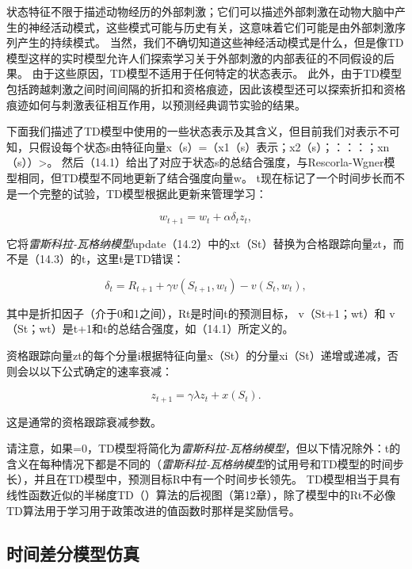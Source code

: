 {状态特征不限于描述动物经历的外部刺激；它们可以描述外部刺激在动物大脑中产生的神经活动模式，这些模式可能与历史有关，这意味着它们可能是由外部刺激序列产生的持续模式。
当然，我们不确切知道这些神经活动模式是什么，但是像TD模型这样的实时模型允许人们探索学习关于外部刺激的内部表征的不同假设的后果。
由于这些原因，TD模型不适用于任何特定的状态表示。
此外，由于TD模型包括跨越刺激之间时间间隔的折扣和资格痕迹，因此该模型还可以探索折扣和资格痕迹如何与刺激表征相互作用，以预测经典调节实验的结果。


下面我们描述了TD模型中使用的一些状态表示及其含义，但目前我们对表示不可知，只假设每个状态s由特征向量x（s）=（x1（s）表示；x2（s）；：：：；xn（s））>。
然后（14.1）给出了对应于状态s的总结合强度，与Rescorla-Wgner模型相同，但TD模型不同地更新了结合强度向量w。
t现在标记了一个时间步长而不是一个完整的试验，TD模型根据此更新来管理学习：

\begin{equation}\label{key}
	w_{t+1} = w_t + \alpha \delta_t z_t,
\end{equation}

它将\textit{雷斯科拉-瓦格纳模型}update（14.2）中的xt（St）替换为合格跟踪向量zt，而不是（14.3）的t，这里t是TD错误：
	
	
\begin{equation}\label{key}
	\delta_t = 
		R_{t+1} + \gamma v (S_{t+1}, w_t) - v(S_t, w_t),
\end{equation}


其中是折扣因子（介于0和1之间），Rt是时间t的预测目标， v（St+1；wt）和 v（St；wt）是t+1和t的总结合强度，如（14.1）所定义的。


资格跟踪向量zt的每个分量i根据特征向量x（St）的分量xi（St）递增或递减，否则会以以下公式确定的速率衰减：

\begin{equation}\label{key}
	z_{t+1} = \gamma \lambda z_t 
		+ x(S_t).
\end{equation}

这是通常的资格跟踪衰减参数。

请注意，如果=0，TD模型将简化为\textit{雷斯科拉-瓦格纳模型}，但以下情况除外：t的含义在每种情况下都是不同的（\textit{雷斯科拉-瓦格纳模型}的试用号和TD模型的时间步长），并且在TD模型中，预测目标R中有一个时间步长领先。
TD模型相当于具有线性函数近似的半梯度TD（）算法的后视图（第12章），除了模型中的Rt不必像TD算法用于学习用于政策改进的值函数时那样是奖励信号。



\subsection{时间差分模型仿真} \label{sec:td_simulation}

}
